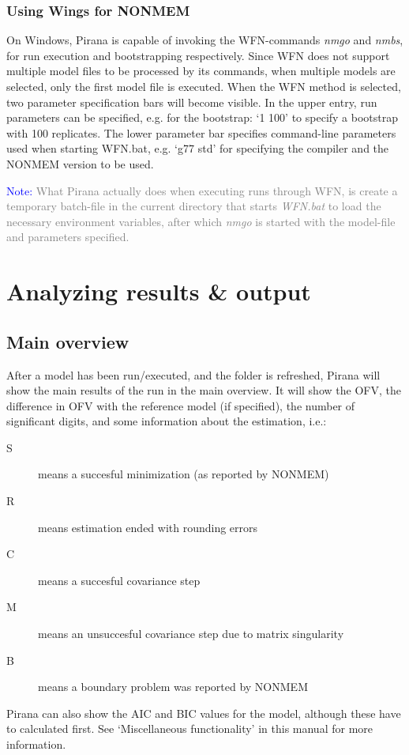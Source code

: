 {{\subsubsection*{Using Wings for NONMEM}
On Windows, Pirana is
capable of invoking the WFN-commands \emph{nmgo} and \emph{nmbs}, for
run execution and bootstrapping respectively. Since
WFN does not support multiple model files to be processed by its
commands, when multiple models are selected, only the first model file
is executed. When the WFN method is selected, two parameter
specification bars will become visible. In the upper entry, run
parameters can be specified, e.g. for the bootstrap: `1 100' to
specify a bootstrap with 100 replicates. The lower parameter bar
specifies command-line parameters used when starting WFN.bat,
e.g. `g77 std' for specifying the compiler and the NONMEM version to
be used.

\vspace{10pt}
\noindent\scriptsize{\textcolor{Blue}{Note:} \textcolor{Grey} {What Pirana actually does when executing runs through WFN, is create a temporary batch-file in the current directory that starts \emph{WFN.bat} to load the necessary environment variables, after which \emph{nmgo} is started with the model-file and parameters specified.}
  \normalsize

\clearpage
\section{Analyzing results \& output}

\subsection{Main overview}
After a model has been run/executed, and the folder is refreshed, Pirana will show the main results of the run in the main overview. It will show the OFV, the difference in OFV with the reference model (if specified), the number of significant digits, and some information about the estimation, i.e.:
\begin{description}
\item [S] means a succesful minimization (as reported by NONMEM)
\item [R] means estimation ended with rounding errors
\item [C] means a succesful covariance step
\item [M] means an unsuccesful covariance step due to matrix singularity
\item [B] means a boundary problem was reported by NONMEM
\end{description}
Pirana can also show the AIC and BIC values for the model, although these have to calculated first. See `Miscellaneous functionality' in this manual for more information.

}}}
